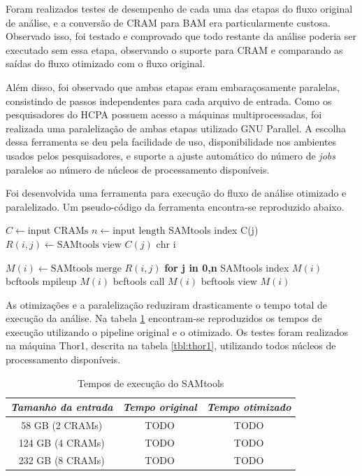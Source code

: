 \documentclass[cic,tc]{iiufrgs}
\begin{document}
Foram realizados testes de desempenho de cada uma das etapas do fluxo original
de análise, e a conversão de CRAM para BAM era particularmente custosa.
Observado isso, foi testado e comprovado que todo restante da análise poderia
ser executado sem essa etapa, observando o suporte para CRAM e comparando as
saídas do fluxo otimizado com o fluxo original.

Além disso, foi observado que ambas etapas eram embaraçosamente paralelas,
consistindo de passos independentes para cada arquivo de entrada. Como os
pesquisadores do HCPA possuem acesso a máquinas multiprocessadas, foi realizada
uma paralelização de ambas etapas utilizado GNU Parallel\cite{tange2011gnu}. A
escolha dessa ferramenta se deu pela facilidade de uso, disponibilidade nos
ambientes usados pelos pesquisadores, e suporte a ajuste automático do número
de \textit{jobs} paralelos ao número de núcleos de processamento disponíveis.

Foi desenvolvida uma ferramenta para execução do fluxo de análise otimizado e
paralelizado. Um pseudo-código da ferramenta encontra-se reproduzido abaixo.

\begin{algorithmic}
  \State $C \gets \text{input CRAMs}$
  \State $n \gets \text{input length}$
  \State SAMtools index C(j)
    \State $R(i,j) \gets \text{SAMtools view } C(j) \text{ chr i}$
  \EndFor
\EndFor

  \State $M(i) \gets \text{SAMtools merge } R(i,j)$ \textbf{for j in 0,n}
  \State SAMtools index $M(i)$
  \State bcftools mpileup $M(i)$
  \State bcftools call $M(i)$
  \State bcftools view $M(i)$
\EndFor
\end{algorithmic}

As otimizações e a paralelização reduziram drasticamente o tempo total de
execução da análise. Na tabela \ref{tbl:SAMtools} encontram-se reproduzidos os
tempos de execução utilizando o pipeline original e o otimizado. Os testes
foram realizados na máquina Thor1, descrita na tabela \ref{tbl:thor1},
utilizando todos núcleos de processamento disponíveis.

\begin{table}[h]
    \caption{Tempos de execução do SAMtools}
    \centering
        \begin{tabular}{c|c|c}
          \hline
          \textit{Tamanho da entrada}  &   \textit{Tempo original}  & \textit{Tempo otimizado} \\
          \hline
          \hline
          58 GB (2 CRAMs) & TODO & TODO \\
          124 GB (4 CRAMs) & TODO & TODO \\
          232 GB (8 CRAMs) & TODO & TODO \\
          \hline
        \end{tabular}
    \label{tbl:SAMtools}
\end{table}
\end{document}
